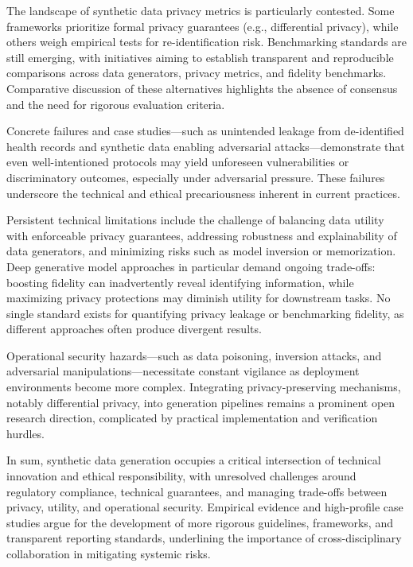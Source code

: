 \documentclass[sigconf]{acmart}
\begin{document}
The landscape of synthetic data privacy metrics is particularly contested. Some frameworks prioritize formal privacy guarantees (e.g., differential privacy), while others weigh empirical tests for re-identification risk. Benchmarking standards are still emerging, with initiatives aiming to establish transparent and reproducible comparisons across data generators, privacy metrics, and fidelity benchmarks. Comparative discussion of these alternatives highlights the absence of consensus and the need for rigorous evaluation criteria.

Concrete failures and case studies—such as unintended leakage from de-identified health records and synthetic data enabling adversarial attacks—demonstrate that even well-intentioned protocols may yield unforeseen vulnerabilities or discriminatory outcomes, especially under adversarial pressure. These failures underscore the technical and ethical precariousness inherent in current practices.

Persistent technical limitations include the challenge of balancing data utility with enforceable privacy guarantees, addressing robustness and explainability of data generators, and minimizing risks such as model inversion or memorization. Deep generative model approaches in particular demand ongoing trade-offs: boosting fidelity can inadvertently reveal identifying information, while maximizing privacy protections may diminish utility for downstream tasks. No single standard exists for quantifying privacy leakage or benchmarking fidelity, as different approaches often produce divergent results.

Operational security hazards—such as data poisoning, inversion attacks, and adversarial manipulations—necessitate constant vigilance as deployment environments become more complex. Integrating privacy-preserving mechanisms, notably differential privacy, into generation pipelines remains a prominent open research direction, complicated by practical implementation and verification hurdles.

In sum, synthetic data generation occupies a critical intersection of technical innovation and ethical responsibility, with unresolved challenges around regulatory compliance, technical guarantees, and managing trade-offs between privacy, utility, and operational security. Empirical evidence and high-profile case studies argue for the development of more rigorous guidelines, frameworks, and transparent reporting standards, underlining the importance of cross-disciplinary collaboration in mitigating systemic risks.
\end{document}

